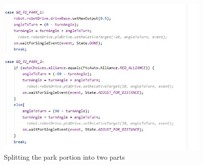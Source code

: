 \begin{figure}[htp]
\centering
\includegraphics[width=0.95\textwidth, angle=0]{Meetings/January/01-14-22/1.14.22 fixed park into 2 parts - James Hu.JPG}
\caption{Splitting the park portion into two parts}
\label{fig:011422_1}
\end{figure}


